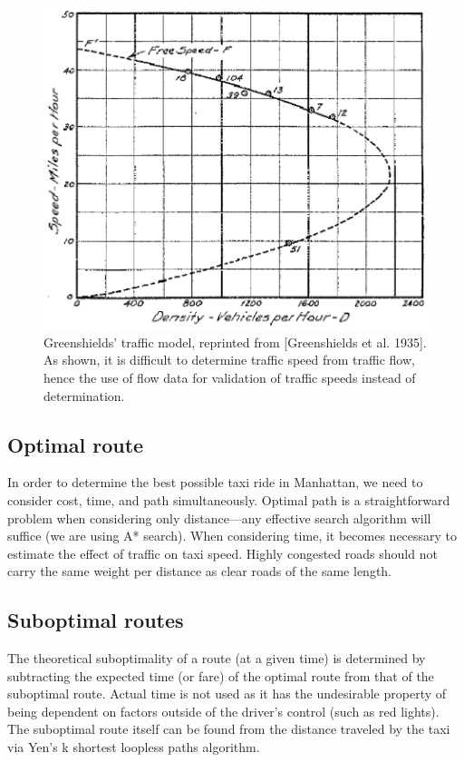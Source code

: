 \documentclass{sig-alternate}
\begin{document}
\begin{figure}
\centering
\includegraphics[scale=.75]{green.eps}
\caption{Greenshields' traffic model, reprinted from [Greenshields et al. 1935]. As shown, it is difficult to determine traffic speed from traffic flow, hence the use of flow data for validation of traffic speeds instead of determination.}
\end{figure}

\subsection{Optimal route}
In order to determine the best possible taxi ride in Manhattan, we need to consider cost, time, and path simultaneously.  Optimal path is a straightforward problem when considering only distance---any effective search algorithm will suffice (we are using A* search).  When considering time, it becomes necessary to estimate the effect of traffic on taxi speed.  Highly congested roads should not carry the same weight per distance as clear roads of the same length.
\subsection{Suboptimal routes}
The theoretical suboptimality of a route (at a given time) is determined by subtracting the expected time (or fare) of the optimal route from that of the suboptimal route. Actual time is not used as it has the undesirable property of being dependent on factors outside of the driver's control (such as red lights). The suboptimal route itself can be found from the distance traveled by the taxi via Yen's k shortest loopless paths algorithm\cite{yen}.
\end{document}
